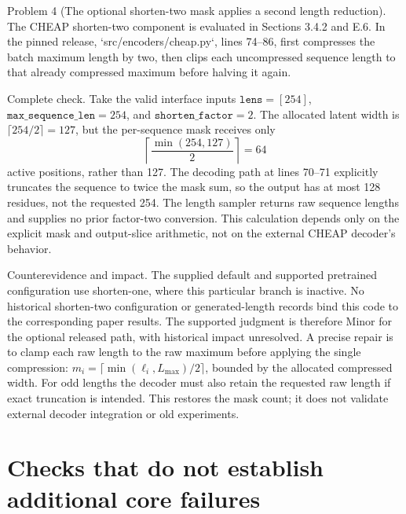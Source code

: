 \documentclass[10pt]{article}
\begin{document}
Problem 4 (The optional shorten-two mask applies a second length reduction).  The CHEAP shorten-two component is evaluated in Sections 3.4.2 and E.6. In the pinned release, `src/encoders/cheap.py`, lines 74–86, first compresses the batch maximum length by two, then clips each uncompressed sequence length to that already compressed maximum before halving it again.\par
Complete check. Take the valid interface inputs \(\texttt{lens}=[254]\), \(\texttt{max\_sequence\_len}=254\), and \(\texttt{shorten\_factor}=2\). The allocated latent width is \(\lceil254/2\rceil=127\), but the per-sequence mask receives only \[\left\lceil\frac{\min(254,127)}2\right\rceil=64\] active positions, rather than 127. The decoding path at lines 70–71 explicitly truncates the sequence to twice the mask sum, so the output has at most 128 residues, not the requested 254. The length sampler returns raw sequence lengths and supplies no prior factor-two conversion. This calculation depends only on the explicit mask and output-slice arithmetic, not on the external CHEAP decoder’s behavior.\par
Counterevidence and impact. The supplied default and supported pretrained configuration use shorten-one, where this particular branch is inactive. No historical shorten-two configuration or generated-length records bind this code to the corresponding paper results. The supported judgment is therefore Minor for the optional released path, with historical impact unresolved. A precise repair is to clamp each raw length to the raw maximum before applying the single compression: \(m_i=\lceil\min(\ell_i,L_{\max})/2\rceil\), bounded by the allocated compressed width. For odd lengths the decoder must also retain the requested raw length if exact truncation is intended. This restores the mask count; it does not validate external decoder integration or old experiments.\par
\section*{Checks that do not establish additional core failures}
\end{document}
